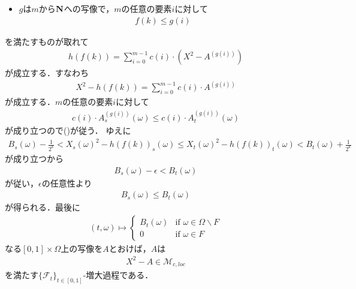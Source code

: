 \begin{sketch}
\begin{description}
\begin{itemize}
					\item $g$は$m$から$\mathbf{N}$への写像で，$m$の任意の要素$i$に対して
						\begin{align}
							f(k) \leq g(i)
						\end{align}
				\end{itemize}
				を満たすものが取れて
				\begin{align}
					h(f(k)) = \sum_{i=0}^{m-1} c(i) \cdot \left( X^{2} - A^{(g(i))} \right)
				\end{align}
				が成立する．すなわち
				\begin{align}
					X^{2} - h(f(k)) = \sum_{i=0}^{m-1} c(i) \cdot A^{(g(i))}
				\end{align}
				が成立する．$m$の任意の要素$i$に対して
				\begin{align}
					c(i) \cdot A^{(g(i))}_{s}(\omega) 
					\leq c(i) \cdot A^{(g(i))}_{t}(\omega) 
				\end{align}
				が成り立つので()が従う．
				ゆえに
				\begin{align}
					B_{s}(\omega) - \frac{1}{2^{k}}
					< {X_{s}(\omega)}^{2} - h(f(k))_{s}(\omega)
					\leq {X_{t}(\omega)}^{2} - h(f(k))_{t}(\omega)
					< B_{t}(\omega) + \frac{1}{2^{k}}
				\end{align}
				が成り立つから
				\begin{align}
					B_{s}(\omega) - \epsilon < B_{t}(\omega)
				\end{align}
				が従い，$\epsilon$の任意性より
				\begin{align}
					B_{s}(\omega) \leq B_{t}(\omega)
				\end{align}
				が得られる．最後に
				\begin{align}
					(t,\omega) \longmapsto
					\begin{cases}
						B_{t}(\omega) & \mbox{if } \omega \in \Omega \backslash F \\
						0 & \mbox{if } \omega \in F
					\end{cases}
				\end{align}
				なる$[0,1] \times \Omega$上の写像を$A$とおけば，$A$は
				\begin{align}
					X^{2} - A \in \mathscr{M}_{c,loc}
				\end{align}
				を満たす$\{\mathscr{F}_{t}\}_{t \in [0,1]}$-増大過程である．
				

\end{description}
\end{sketch}
